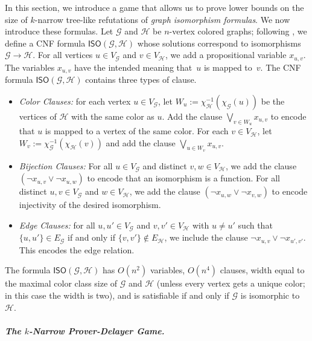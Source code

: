 \documentclass[10pt,a4paper]{article}
\newcommand{\defining}[1]{\emph{#1}}
\newcommand{\inv}[1]{#1^{-1}}
\newcommand{\graphG}{\mathcal{G}}
\newcommand{\graphH}{\mathcal{H}}
\newcommand{\vertexG}{V_{\graphG}}
\newcommand{\vertexH}{V_{\graphH}}
\newcommand{\edgeG}{E_{\graphG}}
\newcommand{\edgeH}{E_{\graphH}}
\newcommand{\coloringG}{\chi_{\graphG}}
\newcommand{\coloringH}{\chi_{\graphH}}
\newcommand{\ISO}{\mathsf{ISO}(\graphG, \graphH)}
\begin{document}
In this section, we introduce a game that allows us to prove lower bounds on the size of $k$-narrow tree-like refutations of \defining{graph isomorphism formulas}. We now introduce these formulas.
%
Let $\graphG$ and $\graphH$ be $n$-vertex colored graphs; following
\cite{DBLP:journals/tocl/ToranW23}, we define a CNF
formula $\ISO$ whose solutions correspond to isomorphisms $\graphG \to
\graphH$. 
For all vertices $u \in \vertexG$ and $v \in \vertexH$,
we add a propositional variable $x_{u,v}$. The variables $x_{u,v}$ have the intended meaning that~$u$ is mapped to~$v$.
The CNF formula $\ISO$ contains three types of clause.
%
\begin{itemize}
\item \defining{Color Clauses:}
for each vertex $u \in \vertexG$,
let $W_u := \inv{\coloringH}(\coloringG(u))$ be the vertices of $\graphH$ with the same color as $u$.
Add
 the clause $\bigvee_{v \in W_u} x_{u,v}$ to encode that $u$ is mapped to a vertex of the same color.
 For each $v \in \vertexH$,
 let $W_v := \inv{\coloringG}(\coloringH(v))$ and add the clause $\bigvee_{u \in W_v} x_{u,v} $. 
\item \defining{Bijection Clauses:} 
For all $u\in \vertexG$ and distinct $v,w \in \vertexH$, we add the clause $(\neg x_{u,v} \vee \neg x_{u,w})$ to encode that an isomorphism is a function.
For all distinct $u,v \in \vertexG$ and $w \in \vertexH$, we add the clause $(\neg x_{u,w} \vee \neg x_{v,w})$ to encode
injectivity of the desired isomorphism. 
%

\item \defining{Edge Clauses:} for all $u,u' \in \vertexG$ and $v, v' \in \vertexH$ with $u\neq u'$ such that $\{u,u'\} \in \edgeG$ if and only if $\{v, v' \} \not \in \edgeH$, we include the 
clause $\neg x_{u,v} \vee \neg x_{u',v'}$. This encodes the edge relation.
\end{itemize}
\noindent The formula $\ISO$ has $O(n^2)$ variables, $O(n^4)$ clauses, width equal  to the maximal color class size of $\graphG$ and $\graphH$ (unless every vertex gets a unique color; in this case the width is two),
and is satisfiable if and only if $\graphG$ is isomorphic to $\graphH$.


\subparagraph*{The \texorpdfstring{$k$}{k}-Narrow Prover-Delayer Game.}
\end{document}
